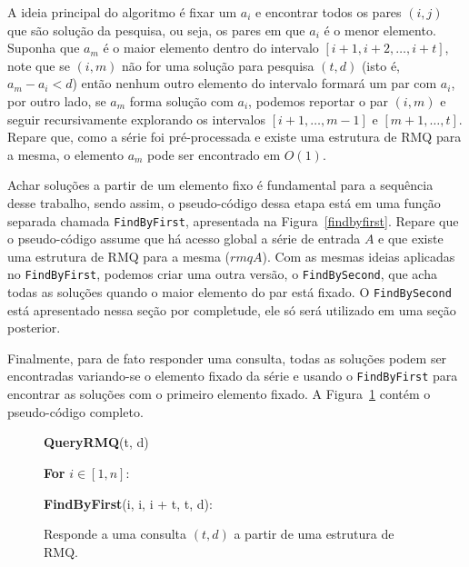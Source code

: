 \documentclass[12pt]{article}
\begin{document}
A ideia principal do algoritmo é fixar um $a_i$ e encontrar todos os pares $(i, j)$ 
que são solução da pesquisa, ou seja, os pares em que $a_i$ é o menor elemento. 
Suponha que $a_m$ é o maior elemento dentro do intervalo $[i+1, i+2, \ldots, i+t]$, 
note que se $(i, m)$ não for uma solução para pesquisa $(t, d)$ (isto é, $a_m - a_i < d$) então
nenhum outro elemento do intervalo formará um par com $a_i$, por outro lado, se $a_m$  
forma solução com $a_i$, podemos reportar o par $(i, m)$ e seguir recursivamente explorando os intervalos
$[i+1, \ldots, m - 1]$ e $[m + 1, \ldots, t]$. Repare que, como a série foi
pré-processada e existe uma estrutura de RMQ para a mesma, o elemento $a_m$
pode ser encontrado em $O(1)$.

Achar soluções a partir de um elemento fixo é fundamental para a sequência
desse trabalho, sendo assim, o pseudo-código dessa etapa está em uma função separada chamada \verb|FindByFirst|,
apresentada na Figura~\ref{findbyfirst}. Repare que o pseudo-código assume que há acesso global a série
de entrada $A$ e que existe uma estrutura de RMQ para a mesma ($rmqA$). Com as mesmas
ideias aplicadas no \verb|FindByFirst|, podemos criar uma outra versão, o \verb|FindBySecond|, que
acha todas as soluções quando o maior elemento do par está fixado. O \verb|FindBySecond| está apresentado
nessa seção por completude, ele só será utilizado em uma seção posterior.

Finalmente, para de fato responder uma consulta, todas as soluções podem ser encontradas variando-se o 
elemento fixado da série e usando o \verb|FindByFirst| para encontrar as soluções com
o primeiro elemento fixado. A Figura~\ref{queryrmq} contém  o pseudo-código completo.

\bigskip
\begin{figure}
\begin{framed}
{\bf QueryRMQ}(t, d)

\hspace{1cm} {\bf For} $i \in [1, n]$:

\hspace{2cm} {\bf FindByFirst}(i, i, i + t, t, d):
\caption{Responde a uma consulta $(t,d)$ a partir de uma estrutura de RMQ.}
\label{queryrmq}
\end{framed}
\end{figure}
\end{document}
